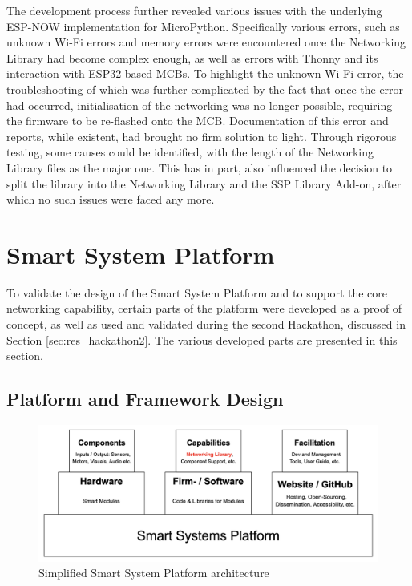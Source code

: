 The development process further revealed various issues with the underlying ESP-NOW implementation for MicroPython. Specifically various errors, such as unknown Wi-Fi errors and memory errors were encountered once the Networking Library had become complex enough, as well as errors with Thonny and its interaction with ESP32-based MCBs. To highlight the unknown Wi-Fi error, the troubleshooting of which was further complicated by the fact that once the error had occurred, initialisation of the networking was no longer possible, requiring the firmware to be re-flashed onto the MCB. Documentation of this error and reports, while existent, had brought no firm solution to light. Through rigorous testing, some causes could be identified, with the length of the Networking Library files as the major one. This has in part, also influenced the decision to split the library into the Networking Library and the SSP Library Add-on, after which no such issues were faced any more.


\section{\label{sec:res_capabilities}Smart System Platform} %

To validate the design of the Smart System Platform and to support the core networking capability, certain parts of the platform were developed as a proof of concept, as well as used and validated during the second Hackathon, discussed in Section \ref{sec:res_hackathon2}. The various developed parts are presented in this section.

\subsection{\label{sec:res_design}Platform and Framework Design} %

\begin{figure}[H]
    \centering
    \includegraphics[width=\linewidth]{overleaf/images/SSP.png}
    \vspace{\ftspace}
    \caption{Simplified Smart System Platform architecture}
    \label{fig:ssp_architecture}
\end{figure}

